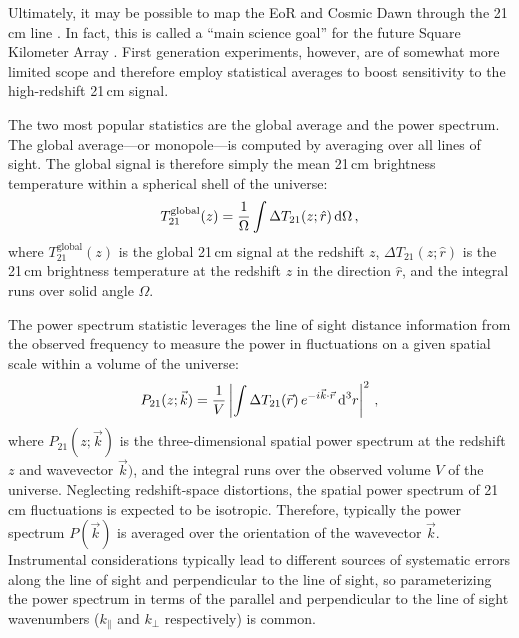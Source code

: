 \begin{bibunit}
Ultimately, it may be possible to map the EoR and Cosmic Dawn through the 21\,cm line
\citep{1997ApJ...475..429M}. In fact, this is called a ``main science goal'' for the future Square
Kilometer Array \citep[SKA;][]{2013ExA....36..235M}.  First generation experiments, however, are of
somewhat more limited scope and therefore employ statistical averages to boost sensitivity to the
high-redshift 21\,cm signal.

The two most popular statistics are the global average and the power spectrum. The global
average---or monopole---is computed by averaging over all lines of sight. The global signal is
therefore simply the mean 21\,cm brightness temperature within a spherical shell of the universe:
\begin{equation}
    T^\text{global}_{21}(z) = \frac{1}{\Omega}\int \Delta T_{21}(z; \hat{r}) \, {\textrm d}\Omega \,,
\end{equation}
where $T^\text{global}_{21}(z)$ is the global 21\,cm signal at the redshift $z$, $\Delta
T_{21}(z; \hat{r})$ is the 21\,cm brightness temperature at the redshift $z$ in the direction
$\hat{r}$, and the integral runs over solid angle $\Omega$.

The power spectrum statistic leverages the line of sight distance information from the observed
frequency to measure the power in fluctuations on a given spatial scale within a volume of the
universe:
\begin{equation}
    P_{21}(z; \vec{k}) =
        \frac{1}{V}\left|
        \int \Delta T_{21}(\vec{r}) \, e^{-i\vec{k}\cdot\vec{r}} \, {\textrm d}^3r
        \right|^2\,,
\end{equation}
where $P_{21}(z; \vec{k})$ is the three-dimensional spatial power spectrum at the redshift $z$ and
wavevector $\vec{k})$, and the integral runs over the observed volume $V$ of the universe.
Neglecting redshift-space distortions, the spatial power spectrum of 21\,cm fluctuations is expected
to be isotropic. Therefore, typically the power spectrum $P(\vec{k})$ is averaged over the
orientation of the wavevector $\vec{k}$. Instrumental considerations typically lead to different
sources of systematic errors along the line of sight and perpendicular to the line of sight, so
parameterizing the power spectrum in terms of the parallel and perpendicular to the line of sight
wavenumbers ($k_\parallel$ and $k_\perp$ respectively) is common.


\end{bibunit}
